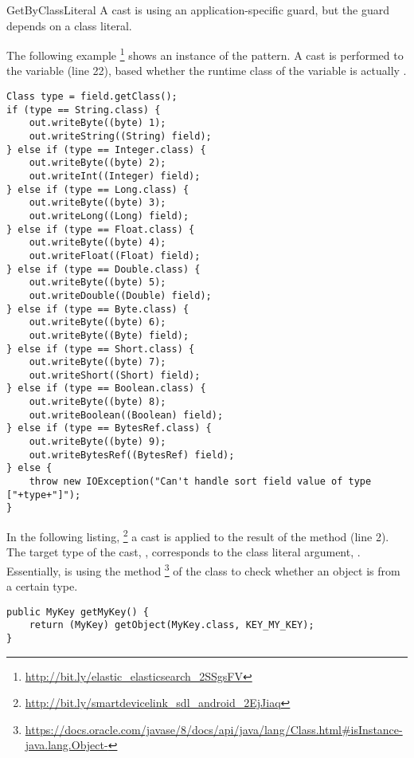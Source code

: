 \begin{pattern}{GetByClassLiteral}
A cast is using an application-specific guard,
but the guard depends on a class literal.

\instances{}
The following example%
\footnote{\url{http://bit.ly/elastic_elasticsearch_2SSgsFV}}
shows an instance of the \thisp{} pattern.
A cast is performed to the  variable (line 22),
based whether the runtime class of the variable is actually .

\begin{verbatim}
Class type = field.getClass();
if (type == String.class) {
    out.writeByte((byte) 1);
    out.writeString((String) field);
} else if (type == Integer.class) {
    out.writeByte((byte) 2);
    out.writeInt((Integer) field);
} else if (type == Long.class) {
    out.writeByte((byte) 3);
    out.writeLong((Long) field);
} else if (type == Float.class) {
    out.writeByte((byte) 4);
    out.writeFloat((Float) field);
} else if (type == Double.class) {
    out.writeByte((byte) 5);
    out.writeDouble((Double) field);
} else if (type == Byte.class) {
    out.writeByte((byte) 6);
    out.writeByte((Byte) field);
} else if (type == Short.class) {
    out.writeByte((byte) 7);
    out.writeShort((Short) field);
} else if (type == Boolean.class) {
    out.writeByte((byte) 8);
    out.writeBoolean((Boolean) field);
} else if (type == BytesRef.class) {
    out.writeByte((byte) 9);
    out.writeBytesRef((BytesRef) field);
} else {
    throw new IOException("Can't handle sort field value of type ["+type+"]");
}
\end{verbatim}

In the following listing,%
\footnote{\url{http://bit.ly/smartdevicelink_sdl_android_2EjJiaq}}
a cast is applied to the result of the  method (line 2).
The target type of the cast, , corresponds to the class literal argument, .
Essentially,  is using the  method%
\footnote{\url{https://docs.oracle.com/javase/8/docs/api/java/lang/Class.html\#isInstance-java.lang.Object-}}
of the class  to check whether an object is from a certain type.

\begin{verbatim}
public MyKey getMyKey() {
    return (MyKey) getObject(MyKey.class, KEY_MY_KEY);
} 
\end{verbatim}


\end{pattern}
